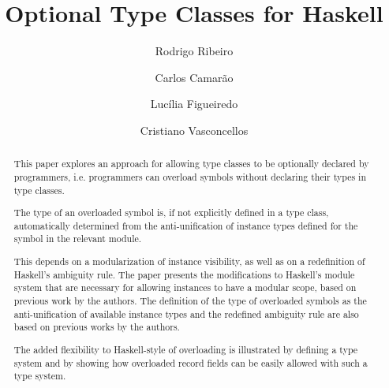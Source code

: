 \documentclass{llncs}
\begin{document}




\mainmatter 

\title{Optional Type Classes for Haskell}

\author{Rodrigo Ribeiro  \and Carlos Camar\~ao \and Luc\'ilia
Figueiredo \and Cristiano Vasconcellos}
\maketitle 

\begin{abstract}

This paper explores an approach for allowing type classes to be
optionally declared by programmers, i.e. programmers can overload
symbols without declaring their types in type classes.

The type of an overloaded symbol is, if not explicitly defined in a
type class, automatically determined from the anti-unification of
instance types defined for the symbol in the relevant module.

This depends on a modularization of instance visibility, as well as on
a redefinition of Haskell's ambiguity rule. The paper presents the
modifications to Haskell's module system that are necessary for
allowing instances to have a modular scope, based on previous work by
the authors. The definition of the type of overloaded symbols as the
anti-unification of available instance types and the redefined
ambiguity rule are also based on previous works by the authors.

The added flexibility to Haskell-style of overloading is illustrated
by defining a type system and by showing how overloaded record fields
can be easily allowed with such a type system.

\end{abstract}





















\end{document}
